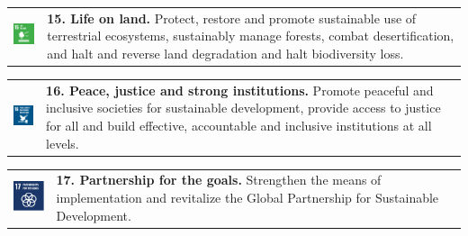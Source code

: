 \begin{multicols}{2}

    \small
    \setlength\tabcolsep{0pt}
    \renewcommand*{\arraystretch}{1}

    \noindent
    \begin{tabular}{p{25mm} p{46mm}}
        \vspace{0mm} \includegraphics[width=2cm]{text/appendix/appendix-sdg/resources/sdg15.pdf} & \vspace{-0.5mm} \textbf{15. Life on land.} Protect, restore and promote sustainable use of terrestrial ecosystems, sustainably manage forests, combat desertification, and halt and reverse land degradation and halt biodiversity loss. \\
    \end{tabular}

    \noindent
    \begin{tabular}{p{25mm} p{46mm}}
        \vspace{0mm} \includegraphics[width=2cm]{text/appendix/appendix-sdg/resources/sdg16.pdf} & \vspace{-0.5mm} \textbf{16. Peace, justice and strong institutions.} Promote peaceful and inclusive societies for sustainable development, provide access to justice for all and build effective, accountable and inclusive institutions at all levels. \\
    \end{tabular}

    \noindent
    \begin{tabular}{p{25mm} p{46mm}}
        \vspace{0mm} \includegraphics[width=2cm]{text/appendix/appendix-sdg/resources/sdg17.pdf} & \vspace{-0.5mm} \textbf{17. Partnership for the goals.} Strengthen the means of implementation and revitalize the Global Partnership for Sustainable Development. \\
    \end{tabular}

\end{multicols}